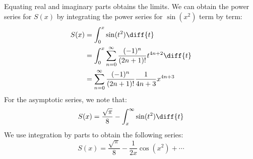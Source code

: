             Equating real and imaginary parts obtains the limits.
            We can obtain the power series for $S(x)$ by integrating
            the power series for $\sin(x^{2})$ term by term:
            \begin{align}
                S(x)&=\int_{0}^{x}\sin(t^{2})\diff{t}\\
                &=\int_{0}^{x}\sum_{n=0}^{\infty}
                \frac{(-1)^{n}}{(2n+1)!}t^{4n+2}\diff{t}\\
                &=\sum_{n=0}^{\infty}
                \frac{(-1)^{n}}{(2n+1)!}\frac{1}{4n+3}x^{4n+3}
            \end{align}
            For the asymptotic series, we note that:
            \begin{equation}
                S(x)=\frac{\sqrt{\pi}}{8}-
                \int_{x}^{\infty}\sin(t^{2})\diff{t}
            \end{equation}
            We use integration by parts to obtain the following
            series:
            \begin{equation}
                S(x)=
                \frac{\sqrt{\pi}}{8}-\frac{1}{2x}\cos(x^{2})+\cdots
            \end{equation}
